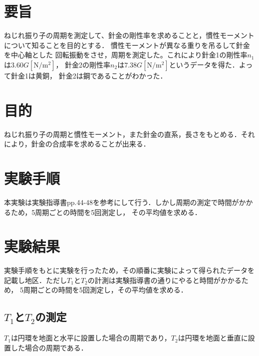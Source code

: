 \documentclass[a4paper,11pt]{ltjsarticle}
\begin{document}
\section{要旨}
ねじれ振り子の周期を測定して、針金の剛性率を求めることと，慣性モーメントについて知ることを目的とする．
慣性モーメントが異なる重りを吊るして針金を中心軸とした
回転振動をさせ，周期を測定した。これにより針金1の剛性率$n_1$は$3.60G[\mathrm{N/m^2}]$，
針金2の剛性率$n_2$は$7.38G[\mathrm{N/m^2}]$というデータを得た．よって針金1は黄銅，
針金2は鋼であることがわかった．
\section{目的}
ねじれ振り子の周期と慣性モーメント，また針金の直系，長さをもとめる．それにより，針金の合成率を求めることが出来る．
\section{実験手順}
本実験は実験指導書pp.44-48を参考にして行う．しかし周期の測定で時間がかかるため，5周期ごとの時間を5回測定し，
その平均値を求める．

\section{実験結果}
実験手順をもとに実験を行ったため，その順番に実験によって得られたデータを記載し地区．ただし$T_1$と$T_2$の計測は実験指導書の通りにやると時間がかかるため，
5周期ごとの時間を5回測定し，その平均値を求める．
\subsection{$T_1$と$T_2$の測定}
$T_1$は円環を地面と水平に設置した場合の周期であり，$T_2$は円環を地面と垂直に設置した場合の周期である．
\end{document}
